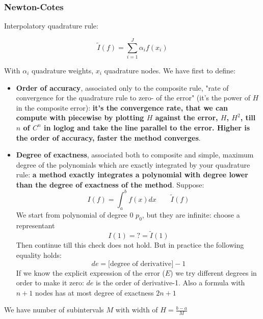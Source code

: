 \subsubsection{Newton-Cotes}
Interpolatory quadrature rule:
\begin{LARGE}
    $$
    \tilde{I}(f)=\sum_{i=1}^J\alpha_if(x_i)
    $$
\end{LARGE}
With $\alpha_i$ quadrature weights, $x_i$ quadrature nodes. We have first to define:
\begin{itemize}
    \item \textbf{Order of accuracy}, associated only to the composite rule, "rate of convergence for the quadrature rule to zero- of the error" (it's the power of $H$ in the composite error): \textbf{it's the convergence rate, that we can compute with piecewise by plotting $H$ against the error, $H$, $H^2$, till $n$ of $C^n$ in loglog and take the line parallel to the error. Higher is the order of accuracy, faster the method converges}.
    \item \textbf{Degree of exactness}, associated both to composite and simple, maximum degree of the polynomials which are exactly integrated by your quadrature rule: \textbf{a method exactly integrates a polynomial with degree lower than the degree of exactness of the method}. Suppose:
    $$
    I(f)=\int_a^bf(x)dx\qquad\tilde{I}(f)
    $$
    We start from polynomial of degree 0 $p_0$, but they are infinite: choose a representant
    $$
    I(1)=?=\tilde{I}(1)
    $$
    Then continue till this check does not hold. But in practice the following equality holds:
    $$
    de=\text{[degree of derivative]}-1
    $$
    If we know the explicit expression of the error ($E$) we try different degrees in order to make it zero: $de$ is the order of derivative-1. Also a formula with $n+1$ nodes has at most degree of exactness $2n+1$
\end{itemize}
We have number of subintervals $M$ with width of $H=\frac{b-a}{M}$

